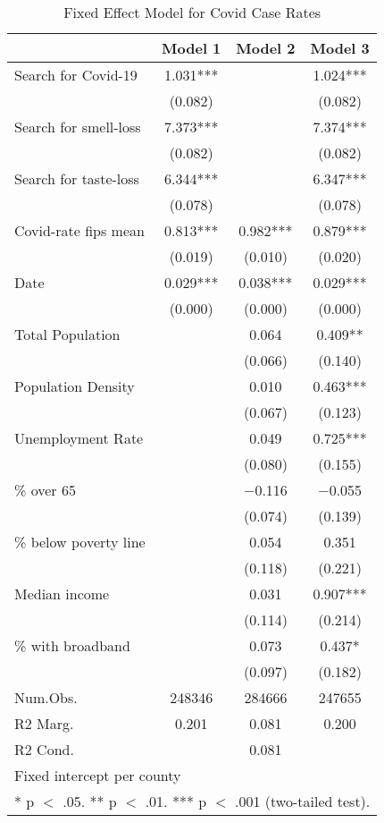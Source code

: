 \begin{table}[!h]

\caption{\label{tab:covid_analysis}Fixed Effect Model for Covid Case Rates}
\centering
\fontsize{8}{10}\selectfont

\begin{tabular}{lccc}
\toprule
  & Model 1 & Model 2 & Model 3\\
\midrule
Search for Covid-19 & \num{1.031}*** &  & \num{1.024}***\\
 & (\num{0.082}) &  & \vphantom{1} (\num{0.082})\\
Search for smell-loss & \num{7.373}*** &  & \num{7.374}***\\
 & (\num{0.082}) &  & (\num{0.082})\\
Search for taste-loss & \num{6.344}*** &  & \num{6.347}***\\
 & (\num{0.078}) &  & (\num{0.078})\\
Covid-rate fips mean & \num{0.813}*** & \num{0.982}*** & \num{0.879}***\\
 & (\num{0.019}) & (\num{0.010}) & (\num{0.020})\\
Date & \num{0.029}*** & \num{0.038}*** & \num{0.029}***\\
 & (\num{0.000}) & (\num{0.000}) & (\num{0.000})\\
Total Population &  & \num{0.064} & \num{0.409}**\\
 &  & (\num{0.066}) & (\num{0.140})\\
Population Density &  & \num{0.010} & \num{0.463}***\\
 &  & (\num{0.067}) & (\num{0.123})\\
Unemployment Rate &  & \num{0.049} & \num{0.725}***\\
 &  & (\num{0.080}) & (\num{0.155})\\
\% over 65 &  & \num{-0.116} & \num{-0.055}\\
 &  & (\num{0.074}) & (\num{0.139})\\
\% below poverty line &  & \num{0.054} & \num{0.351}\\
 &  & (\num{0.118}) & (\num{0.221})\\
Median income &  & \num{0.031} & \num{0.907}***\\
 &  & (\num{0.114}) & (\num{0.214})\\
\% with broadband &  & \num{0.073} & \num{0.437}*\\
 &  & (\num{0.097}) & (\num{0.182})\\
\midrule
Num.Obs. & \num{248346} & \num{284666} & \num{247655}\\
R2 Marg. & \num{0.201} & \num{0.081} & \num{0.200}\\
R2 Cond. &  & \num{0.081} & \\
\bottomrule
\multicolumn{4}{l}{\rule{0pt}{1em}Fixed intercept per county}\\
\multicolumn{4}{l}{\rule{0pt}{1em}* p $<$ .05. ** p $<$ .01. *** p $<$ .001 (two-tailed test).}\\
\end{tabular}
\end{table}